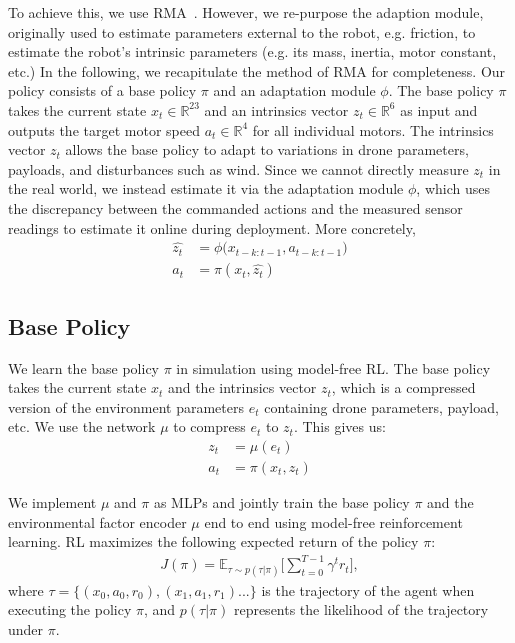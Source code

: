  To achieve this, we use RMA~\cite{kumar2021rma}. However, we re-purpose the adaption module, originally used to estimate parameters external to the robot, e.g. friction, to estimate the robot's intrinsic parameters (e.g. its mass, inertia, motor constant, etc.) In the following, we recapitulate the method of RMA for completeness. Our policy consists of a base policy $\pi$ and an adaptation module $\phi$. The base policy $\pi$ takes the current state $x_t \in \mathbb{R}^{23}$ and an intrinsics vector $z_t \in \mathbb{R}^6$
 as input and outputs the target motor speed $a_t \in \mathbb{R}^4$ for all individual motors. The intrinsics vector $z_t$ allows the base policy to adapt to variations in drone parameters, payloads, and disturbances such as wind. Since we cannot directly measure $z_t$ in the real world, we instead estimate it via the adaptation module $\phi$, which uses the discrepancy between the commanded actions and the measured sensor readings to estimate it online during deployment. More concretely, 
\begin{align}
    \hat{z_t} &=  \phi\big(x_{t-k:t-1}, a_{t-k:t-1}\big) \\
    a_t &= \pi(x_t, \hat{z_t}) \label{eq:pi}
\end{align}

\subsection{Base Policy}
We learn the base policy $\pi$ in simulation using model-free RL. The base policy takes the current state $x_t$ and the intrinsics vector $z_t$, which is a compressed version of the environment parameters $e_t$ containing drone parameters, payload, etc. We use the network $\mu$ to compress $e_t$ to $z_t$. This gives us:
\begin{align}
        z_t &= \mu(e_t) \\  
        a_t &= \pi(x_t, z_t)
\end{align}


We implement $\mu$ and $\pi$ as MLPs and jointly train the base policy $\pi$ and the environmental factor encoder $\mu$ end to end using model-free reinforcement learning. RL maximizes the following expected return of the policy $\pi$: 
\begin{align}
    J(\pi) = \mathbb{E}_{\tau \sim p(\tau|\pi)}\Bigg[\sum_{t=0}^{T-1}\gamma^t r_t\Bigg],
\end{align}
where $\tau = \{(x_0, a_0, r_0), (x_1, a_1, r_1) . . .\}$ is the trajectory of the agent when executing the policy $\pi$, and $p(\tau|\pi)$ represents the likelihood of the trajectory under $\pi$.

